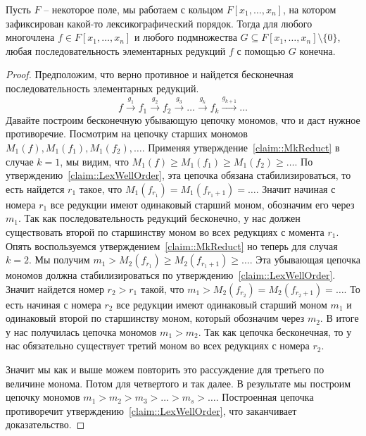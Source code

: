 \begin{claim}
\label{claim::ReductFin}
Пусть $F$ -- некоторое поле, мы работаем с кольцом $F[x_1,\ldots,x_n]$, на котором зафиксирован какой-то лексикографический порядок.
Тогда для любого многочлена $f\in F[x_1,\ldots,x_n]$ и любого подмножества $G\subseteq F[x_1,\ldots,x_n]\setminus\{0\}$, любая последовательность элементарных редукций $f$ с помощью $G$ конечна.
\end{claim}
\begin{proof}
Предположим, что верно противное и найдется бесконечная последовательность элементарных редукций.
\[
f\stackrel{g_1}{\longrightarrow}f_1\stackrel{g_2}{\longrightarrow}f_2\stackrel{g_3}{\longrightarrow}\ldots \stackrel{g_k}{\longrightarrow}f_k\stackrel{g_{k+1}}{\longrightarrow}\ldots
\]
Давайте построим бесконечную убывающую цепочку мономов, что и даст нужное противоречие.
Посмотрим на цепочку старших мономов $M_1(f),M_1(f_1), M_1(f_2),\ldots$.
Применяя утверждение~\ref{claim::MkReduct} в случае $k = 1$, мы видим, что $M_1(f) \geqslant M_1(f_1)\geqslant M_1(f_2) \geqslant \ldots$.
По утверждению~\ref{claim::LexWellOrder},  эта цепочка обязана стабилизироваться, то есть найдется $r_1$ такое, что $M_1(f_{r_1}) = M_1(f_{r_1+1})=\ldots$.
Значит начиная с номера $r_1$ все редукции имеют одинаковый старший моном, обозначим его через $m_1$.
Так как последовательность редукций бесконечно, у нас должен существовать второй по старшинству моном во всех редукциях с момента $r_1$.
Опять воспользуемся утверждением~\ref{claim::MkReduct} но теперь для случая $k = 2$.
Мы получим $m_1 > M_2(f_{r_1})\geqslant M_2(f_{r_1 + 1})\geqslant \ldots$.
Эта убывающая цепочка мономов должна стабилизироваться по утверждению~\ref{claim::LexWellOrder}.
Значит найдется номер $r_2 > r_1$ такой, что $m_1 > M_2(f_{r_2}) = M_2(f_{r_2+1})=\ldots$.
То есть начиная с номера $r_2$ все редукции имеют одинаковый старший моном $m_1$ и одинаковый второй по старшинству моном, который обозначим через $m_2$.
В итоге у нас получилась цепочка мономов $m_1 > m_2$.
Так как цепочка бесконечная, то у нас обязательно существует третий моном во всех редукциях с номера $r_2$.

Значит мы как и выше можем повторить это рассуждение для третьего по величине монома.
Потом для четвертого и так далее.
В результате мы построим цепочку мономов $m_1 > m_2 > m_3 > \ldots > m_s> \ldots$.
Построенная цепочка противоречит утверждению~\ref{claim::LexWellOrder}, что заканчивает доказательство.
\end{proof}


